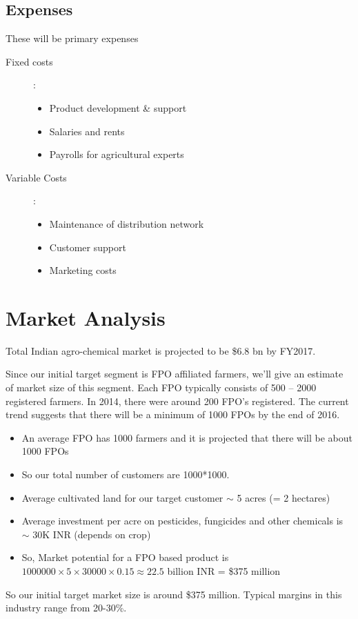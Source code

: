 \documentclass[a4paper]{article}
\begin{document}
\subsection{Expenses}
These will be primary expenses
\begin{description}
\item[Fixed costs]:
	\begin{itemize}
		\item Product development \& support
		\item Salaries and rents
		\item Payrolls for agricultural experts
	\end{itemize}
\item [Variable Costs]:	
	\begin{itemize}
		\item Maintenance of distribution network
		\item Customer support
		\item Marketing costs
	\end{itemize}




\end{description}

\section{Market Analysis}
Total Indian agro-chemical market is projected to be \$6.8 bn by FY2017. 

Since our initial target segment is FPO affiliated farmers, we'll give an estimate of market size of this segment. Each FPO typically consists of 500 -- 2000 registered farmers. In 2014, there were around 200 FPO's registered. The current trend suggests that there will be a minimum of 1000 FPOs by the end of 2016.

\begin{itemize}
\item[] An average FPO has 1000 farmers and it is projected that there will be about 1000 FPOs
\item[] So our total number of customers are 1000*1000.
\item[] Average cultivated land for our target customer $\sim$  5 acres (= 2 hectares)
\item[] Average investment per acre on pesticides, fungicides and other chemicals is $\sim$ 30K INR (depends on crop)
\item[] So, Market potential for a FPO based product is $1000000 \times 5 \times 30000 \times 0.15 \approx 22.5$ billion INR = \$375 million
\end{itemize}

So our initial target market size is around \$375 million. Typical margins in this industry range from 20-30\%.





\end{document}
